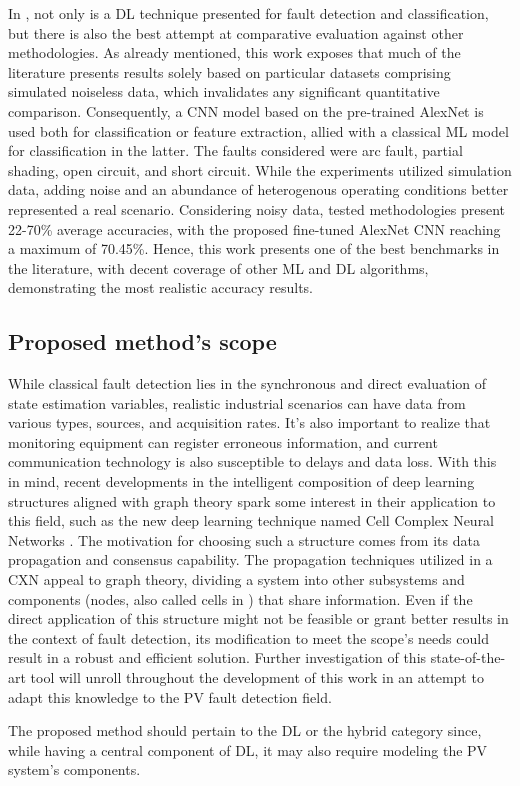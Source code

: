 In \cite{Aziz2020}, not only is a DL technique presented for fault detection and classification, but there is also the best attempt at comparative evaluation against other methodologies. As already mentioned, this work exposes that much of the literature presents results solely based on particular datasets comprising simulated noiseless data, which invalidates any significant quantitative comparison. Consequently, a CNN model based on the pre-trained AlexNet \cite{Krizhevsky2012} is used both for classification or feature extraction, allied with a classical ML model for classification in the latter. The faults considered were arc fault, partial shading, open circuit, and short circuit. While the experiments utilized simulation data, adding noise and an abundance of heterogenous operating conditions better represented a real scenario. Considering noisy data, tested methodologies present 22-70\% average accuracies, with the proposed fine-tuned AlexNet CNN reaching a maximum of 70.45\%. Hence, this work presents one of the best benchmarks in the literature, with decent coverage of other ML and DL algorithms, demonstrating the most realistic accuracy results.


\subsection{Proposed method's scope}

While classical fault detection lies in the synchronous and direct evaluation of state estimation variables, realistic industrial scenarios can have data from various types, sources, and acquisition rates. It's also important to realize that monitoring equipment can register erroneous information, and current communication technology is also susceptible to delays and data loss. With this in mind, recent developments in the intelligent composition of deep learning structures aligned with graph theory spark some interest in their application to this field, such as the new deep learning technique named Cell Complex Neural Networks \cite{Hajij2020}. The motivation for choosing such a structure comes from its data propagation and consensus capability. The propagation techniques utilized in a CXN appeal to graph theory, dividing a system into other subsystems and components (nodes, also called cells in \cite{Hajij2020}) that share information. Even if the direct application of this structure might not be feasible or grant better results in the context of fault detection, its modification to meet the scope's needs could result in a robust and efficient solution. Further investigation of this state-of-the-art tool will unroll throughout the development of this work in an attempt to adapt this knowledge to the PV fault detection field.

The proposed method should pertain to the DL or the hybrid category since, while having a central component of DL, it may also require modeling the PV system's components.